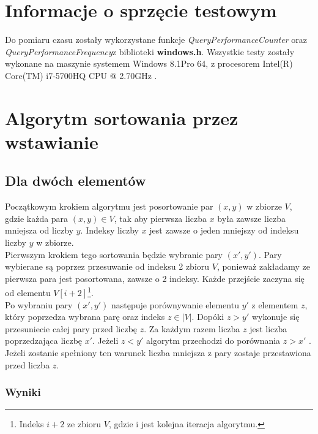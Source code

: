 \section{Informacje o sprzęcie testowym}
Do pomiaru czasu zostały wykorzystane funkcje \textit{QueryPerformanceCounter} oraz \textit{QueryPerformanceFrequency}z biblioteki \textbf{windows.h}. Wszystkie testy zostały wykonane na maszynie systemem Windows 8.1Pro 64, z procesorem Intel(R) Core(TM) i7-5700HQ CPU @ 2.70GHz  .
\section{Algorytm sortowania przez wstawianie}

\subsection*{Dla dwóch elementów}

Początkowym krokiem algorytmu jest posortowanie  par $(x,y) $ w zbiorze $V  $, gdzie każda para $(x,y) \in V$,  tak aby pierwsza liczba $x$  była zawsze liczba mniejsza od liczby $y$. Indeksy liczby $x$ jest zawsze o jeden mniejszy od indeksu liczby $y$ w zbiorze.\\
 Pierwszym krokiem tego sortowania będzie wybranie  pary $(x',y')$. Pary wybierane są poprzez przesuwanie od indeksu 2 zbioru $V$, ponieważ zakładamy ze pierwsza para jest posortowana, zawsze o 2 indeksy. Każde przejście zaczyna się od elementu $V[i+2]$\footnote{Indeks $i+2$ ze zbioru $V$, gdzie i jest kolejna iteracja algorytmu.}.\\
Po wybraniu pary $(x',y')$ następuje porównywanie elementu $y'$ z elementem $z$, który poprzedza wybrana parę oraz indeks $z \in \lvert V \rvert $. Dopóki  $z > y'$  wykonuje się przesuniecie całej pary przed liczbę $z$. Za każdym razem liczba $z$ jest liczba poprzedzająca liczbę $x'$.
Jeżeli  $z < y'$ algorytm przechodzi do porównania $z > x'$ . Jeżeli zostanie spełniony ten warunek liczba mniejsza z pary zostaje przestawiona przed liczba $z$. 
\subsubsection*{Wyniki}
\newpage
